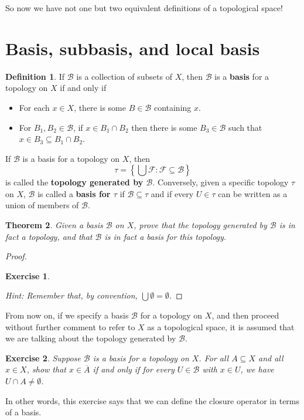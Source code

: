 \documentclass[12pt]{amsart}
\newtheorem{theorem}{Theorem}[section]
\newtheorem{exercise}{Exercise}[section]
\theoremstyle{definition}
\newtheorem{definition}[theorem]{Definition}
\theoremstyle{remark}
\newcommand{\explicitSet}[1]{\left\lbrace #1 \right\rbrace}
\newcommand{\set}[2]{\explicitSet{#1 \colon #2}}
\newcommand{\0}{\emptyset}
\newcommand{\closure}[1]{\overline{#1}}
\newcommand{\F}{\mathcal F}
\newcommand{\B}{\mathcal B}
\begin{document}
So now we have not one but two equivalent definitions of a topological space!

\section{Basis, subbasis, and local basis}

\begin{definition}
If $\B$ is a collection of subsets of $X$, then $\B$ is a \textbf{basis} for a topology on $X$ if and only if
\begin{itemize}
\item For each $x \in X$, there is some $B \in \B$ containing $x$.
\item For $B_1,B_2 \in \B$, if $x \in B_1 \cap B_2$ then there is some $B_3 \in \B$ such that $x \in B_3 \subseteq B_1 \cap B_2$.
\end{itemize}
\end{definition}

If $\B$ is a basis for a topology on $X$, then
$$\tau = \set{\bigcup \F}{\F \subseteq \B}$$
is called the \textbf{topology generated by $\B$}. Conversely, given a specific topology $\tau$ on $X$, $\B$ is called a \textbf{basis for $\tau$} if $\B \subseteq \tau$ and if every $U \in \tau$ can be written as a union of members of $\B$.

\begin{theorem}
Given a basis $\B$ on $X$, prove that the topology generated by $\B$ is in fact a topology, and that $\B$ is in fact a basis for this topology.
\end{theorem}
\begin{proof}
\begin{exercise}\end{exercise}
\emph{Hint: Remember that, by convention, $\bigcup \0 = \0$.}
\end{proof}

From now on, if we specify a basis $\B$ for a topology on $X$, and then proceed without further comment to refer to $X$ as a topological space, it is assumed that we are talking about the topology generated by $\B$.

\begin{exercise}
Suppose $\B$ is a basis for a topology on $X$. For all $A \subseteq X$ and all $x \in X$, show that $x \in \closure{A}$ if and only if for every $U \in \B$ with $x \in U$, we have $U \cap A \neq \0$.
\end{exercise}

In other words, this exercise says that we can define the closure operator in terms of a basis.
\end{document}
